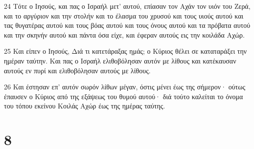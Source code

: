 \par 24 Τότε ο Ιησούς, και πας ο Ισραήλ μετ' αυτού, επίασαν τον Αχάν τον υιόν του Ζερά, και το αργύριον και την στολήν και το έλασμα του χρυσού και τους υιούς αυτού και τας θυγατέρας αυτού και τους βόας αυτού και τους όνους αυτού και τα πρόβατα αυτού και την σκηνήν αυτού και πάντα όσα είχε, και έφεραν αυτούς εις την κοιλάδα Αχώρ.
\par 25 Και είπεν ο Ιησούς, Διά τι κατετάραξας ημάς; ο Κύριος θέλει σε καταταράξει την ημέραν ταύτην. Και πας ο Ισραήλ ελιθοβόλησαν αυτόν με λίθους και κατέκαυσαν αυτούς εν πυρί και ελιθοβόλησαν αυτούς με λίθους.
\par 26 Και έστησαν επ' αυτόν σωρόν λίθων μέγαν, όστις μένει έως της σήμερον· ούτως έπαυσεν ο Κύριος από της εξάψεως του θυμού αυτού· διά τούτο καλείται το όνομα του τόπου εκείνου Κοιλάς Αχώρ έως της ημέρας ταύτης.

\chapter{8}

